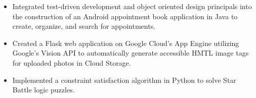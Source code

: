 \documentclass[11pt]{article}
\begin{document}
\begin{itemize}[leftmargin=*, itemsep=0pt, topsep=5pt]
	\item Integrated test-driven development and object oriented design principals into the construction of an Android appointment book application in Java to create, organize, and search for appointments.
	\item Created a Flask web application on Google Cloud’s App Engine utilizing Google’s Vision API to automatically generate accessible HMTL image tags for uploaded photos in Cloud Storage.
	\item Implemented a constraint satisfaction algorithm in Python to solve Star Battle logic puzzles.
\end{itemize} 
\smallskip
\end{document}
